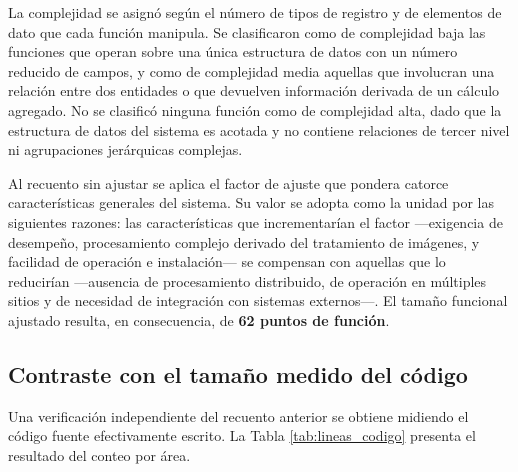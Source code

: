 La complejidad se asignó según el número de tipos de registro y de elementos de
dato que cada función manipula. Se clasificaron como de complejidad baja las
funciones que operan sobre una única estructura de datos con un número reducido
de campos, y como de complejidad media aquellas que involucran una relación entre
dos entidades o que devuelven información derivada de un cálculo agregado. No se
clasificó ninguna función como de complejidad alta, dado que la estructura de
datos del sistema es acotada y no contiene relaciones de tercer nivel ni
agrupaciones jerárquicas complejas.

Al recuento sin ajustar se aplica el factor de ajuste que pondera catorce
características generales del sistema. Su valor se adopta como la unidad por las
siguientes razones: las características que incrementarían el factor ---exigencia
de desempeño, procesamiento complejo derivado del tratamiento de imágenes, y
facilidad de operación e instalación--- se compensan con aquellas que lo
reducirían ---ausencia de procesamiento distribuido, de operación en múltiples
sitios y de necesidad de integración con sistemas externos---. El tamaño funcional
ajustado resulta, en consecuencia, de \textbf{62 puntos de función}.

\subsection{Contraste con el tamaño medido del código}

Una verificación independiente del recuento anterior se obtiene midiendo el
código fuente efectivamente escrito. La Tabla \ref{tab:lineas_codigo} presenta el
resultado del conteo por área.

